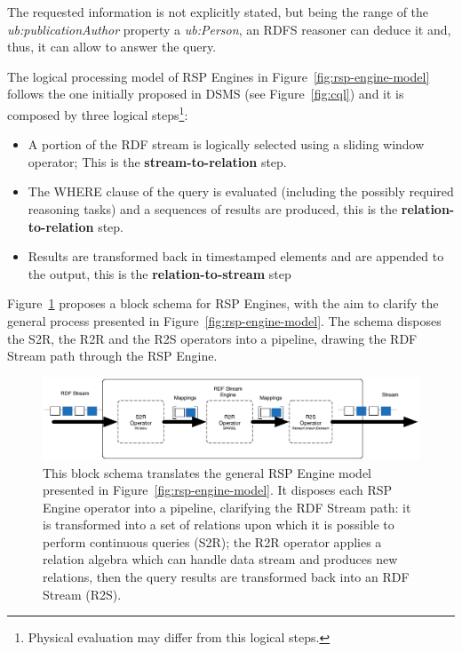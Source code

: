 The requested information is not explicitly stated, but being the range of the \textit{ub:publicationAuthor} property a \textit{ub:Person}, an RDFS reasoner can deduce it and, thus, it can allow to answer the query.

The logical processing model of RSP Engines in Figure~\ref{fig:rsp-engine-model} follows the one initially proposed in DSMS (see Figure~\ref{fig:cql}) and it is composed by three logical steps\footnote{Physical evaluation may differ from this logical steps.}: 
\begin{itemize}
\item[1.] A portion of the RDF stream is logically selected using a sliding window operator; This is the \textbf{stream-to-relation} step. 
\item[2.] The WHERE clause of the query is evaluated (including the possibly required reasoning tasks) and a sequences of results are produced, this is the \textbf{relation-to-relation} step.
\item[3.] Results are transformed back in timestamped elements and are appended to the output, this is the \textbf{relation-to-stream} step 
\end{itemize}

Figure~\ref{fig:rsp-engine-schema} proposes a block schema for RSP Engines, with the aim to clarify the general process presented in Figure~\ref{fig:rsp-engine-model}. The schema disposes the S2R, the R2R and the R2S operators into a pipeline, drawing the RDF Stream path through the RSP Engine.


\begin{figure}[tbh]
  \centering
	\includegraphics[width=\linewidth]{images/rsp-block-schema}
	\caption[RSP Engine Block Schema]{This block schema translates the general RSP Engine model presented in Figure~\ref{fig:rsp-engine-model}. It disposes each RSP Engine operator into a pipeline, clarifying the RDF Stream path: it is transformed into a set of relations upon which it is possible to perform continuous queries (S2R); the R2R operator applies a relation algebra which can handle data stream and produces new relations, then the query results are transformed back into an RDF Stream (R2S).}
  	\label{fig:rsp-engine-schema}
\end{figure}

